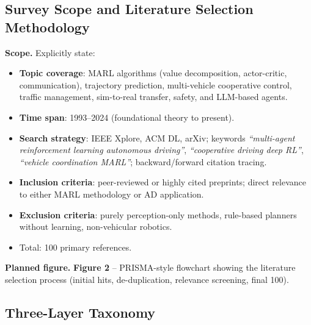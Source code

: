 \documentclass[12pt, a4paper]{article}
\begin{document}
\subsection{Survey Scope and Literature Selection Methodology}

\begin{outline_note}
\textbf{Scope.}
Explicitly state:
\begin{itemize}[nosep]
  \item \textbf{Topic coverage}: MARL algorithms (value decomposition, actor-critic,
        communication), trajectory prediction, multi-vehicle cooperative control,
        traffic management, sim-to-real transfer, safety, and LLM-based agents.
  \item \textbf{Time span}: 1993--2024 (foundational theory to present).
  \item \textbf{Search strategy}: IEEE Xplore, ACM DL, arXiv; keywords
        \emph{``multi-agent reinforcement learning autonomous driving''},
        \emph{``cooperative driving deep RL''}, \emph{``vehicle coordination MARL''};
        backward/forward citation tracing.
  \item \textbf{Inclusion criteria}: peer-reviewed or highly cited preprints;
        direct relevance to either MARL methodology or AD application.
  \item \textbf{Exclusion criteria}: purely perception-only methods, rule-based
        planners without learning, non-vehicular robotics.
  \item Total: 100 primary references.
\end{itemize}

\textbf{Planned figure.}
\textbf{Figure 2} -- PRISMA-style flowchart showing the literature selection
process (initial hits, de-duplication, relevance screening, final 100).
\end{outline_note}

\subsection{Three-Layer Taxonomy}
\end{document}
